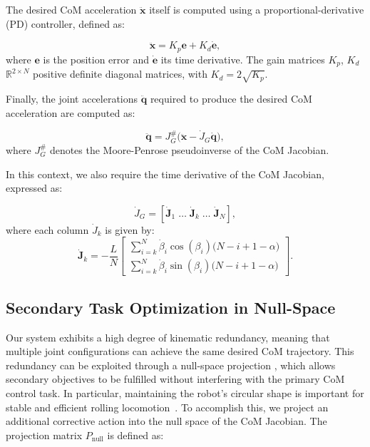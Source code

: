 \documentclass[a4paper, 10pt, conference]{ieeeconf}
\begin{document}
The desired CoM acceleration \(\ddot{\mathbf{x}}\) itself is computed using a proportional-derivative (PD) controller, defined as:

\begin{equation}
    \ddot{\mathbf{x}} = K_p \mathbf{e} + K_d \dot{\mathbf{e}},
\end{equation}
\noindent
where \(\mathbf{e}\) is the position error and \(\dot{\mathbf{e}}\) its time derivative. The gain matrices \(K_p\), \(K_d\) \in \(\mathbb{R}^{2 \times N}\) positive definite diagonal matrices, with \(K_d = 2 \sqrt{K_p}\).

Finally, the joint accelerations \(\ddot{\mathbf{q}}\) required to produce the desired CoM acceleration are computed as:

\begin{equation}
    \ddot{\mathbf{q}} = J_G^{\#}\big(\ddot{\mathbf{x}} - \dot{J}_G \dot{\mathbf{q}}\big),
\end{equation}
\noindent
where \(J_G^{\#}\) denotes the Moore-Penrose pseudoinverse of the CoM Jacobian.


In this context, we also require the time derivative of the CoM Jacobian, expressed as:

\begin{equation}
\dot{J}_G = [\dot{\mathbf{J}}_1 \; \dots \; \dot{\mathbf{J}}_k \; \dots \; \dot{\mathbf{J}}_N],
\end{equation}
\noindent
where each column $\dot{J}_k$ is given by:	
\begin{equation}
\dot{\mathbf{J}}_k = -\frac{L}{N}
\begin{bmatrix} 
 \displaystyle\sum_{{i=k}}^{N}\dot{\beta}_i\cos{(\beta_i)}\big(N-i+1-\alpha\big) \\[6pt]
 \displaystyle\sum_{{i=k}}^{N}\dot{\beta}_i\sin{(\beta_i)}\big(N-i+1-\alpha\big)
\end{bmatrix}.
\end{equation}

\subsection{Secondary Task Optimization in Null-Space}
Our system exhibits a high degree of kinematic redundancy, meaning that multiple joint configurations can achieve the same desired CoM trajectory. This redundancy can be exploited through a null-space projection \cite{b9}, which allows secondary objectives to be fulfilled without interfering with the primary CoM control task. In particular, maintaining the robot’s circular shape is important for stable and efficient rolling locomotion~\cite{b3}. To accomplish this, we project an additional corrective action into the null space of the CoM Jacobian. The projection matrix \( P_{\text{null}} \) is defined as:
\end{document}
